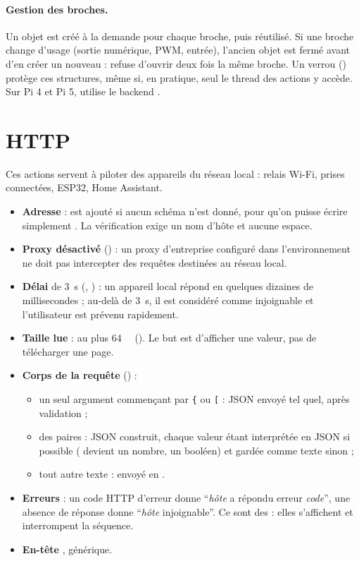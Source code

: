 \paragraph{Gestion des broches.} Un objet  est créé à la demande pour chaque broche, puis réutilisé. Si une broche change d'usage (sortie numérique, PWM, entrée), l'ancien objet est fermé avant d'en créer un nouveau :  refuse d'ouvrir deux fois la même broche. Un verrou () protège ces structures, même si, en pratique, seul le thread des actions y accède. Sur Pi 4 et Pi 5,  utilise le backend .

\section{HTTP}

Ces actions servent à piloter des appareils du réseau local : relais Wi-Fi, prises connectées, ESP32, Home Assistant.

\begin{itemize}
  \item \textbf{Adresse} :  est ajouté si aucun schéma n'est donné, pour qu'on puisse écrire simplement . La vérification exige un nom d'hôte et aucune espace.
  \item \textbf{Proxy désactivé} () : un proxy d'entreprise configuré dans l'environnement ne doit pas intercepter des requêtes destinées au réseau local.
  \item \textbf{Délai} de \qty{3}{\second} (, \empi) : un appareil local répond en quelques dizaines de millisecondes ; au-delà de \qty{3}{\second}, il est considéré comme injoignable et l'utilisateur est prévenu rapidement.
  \item \textbf{Taille lue} : au plus \qty{64}{\kilo\byte} (). Le but est d'afficher une valeur, pas de télécharger une page.
  \item \textbf{Corps de la requête} () :
  \begin{itemize}
    \item un seul argument commençant par \texttt{\{} ou \texttt{[} : JSON envoyé tel quel, après validation ;
    \item des paires  : JSON construit, chaque valeur étant interprétée en JSON si possible ( devient un nombre,  un booléen) et gardée comme texte sinon ;
    \item tout autre texte : envoyé en .
  \end{itemize}
  \item \textbf{Erreurs} : un code HTTP d'erreur donne \enquote{\textit{hôte} a répondu erreur \textit{code}}, une absence de réponse donne \enquote{\textit{hôte} injoignable}. Ce sont des  : elles s'affichent et interrompent la séquence.
  \item \textbf{En-tête} , générique.
\end{itemize}
